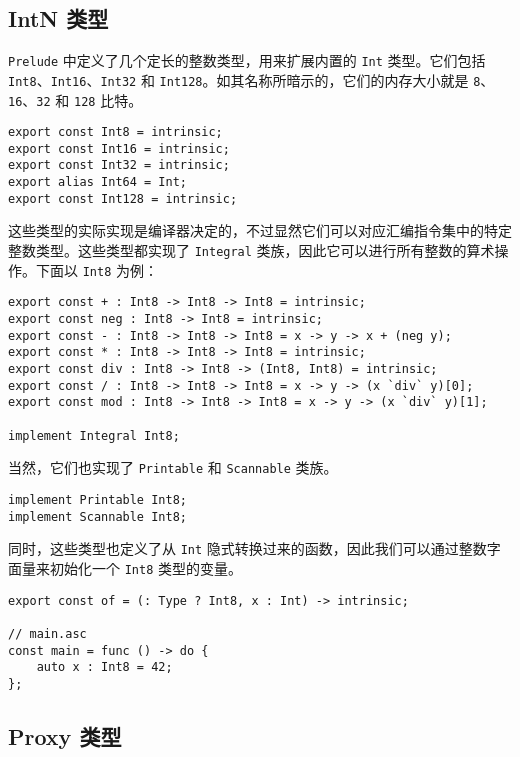 \subsection{IntN 类型}

\lstinline!Prelude! 中定义了几个定长的整数类型，用来扩展内置的 \lstinline!Int! 类型。它们包括 \lstinline!Int8!、\lstinline!Int16!、\lstinline!Int32! 和 \lstinline!Int128!。如其名称所暗示的，它们的内存大小就是 \lstinline!8!、\lstinline!16!、\lstinline!32! 和 \lstinline!128! 比特。

\begin{lstlisting}
export const Int8 = intrinsic;
export const Int16 = intrinsic;
export const Int32 = intrinsic;
export alias Int64 = Int;
export const Int128 = intrinsic;
\end{lstlisting}

这些类型的实际实现是编译器决定的，不过显然它们可以对应汇编指令集中的特定整数类型。这些类型都实现了 \lstinline!Integral! 类族，因此它可以进行所有整数的算术操作。下面以 \lstinline!Int8! 为例：

\begin{lstlisting}
export const + : Int8 -> Int8 -> Int8 = intrinsic;
export const neg : Int8 -> Int8 = intrinsic;
export const - : Int8 -> Int8 -> Int8 = x -> y -> x + (neg y);
export const * : Int8 -> Int8 -> Int8 = intrinsic;
export const div : Int8 -> Int8 -> (Int8, Int8) = intrinsic;
export const / : Int8 -> Int8 -> Int8 = x -> y -> (x `div` y)[0];
export const mod : Int8 -> Int8 -> Int8 = x -> y -> (x `div` y)[1];

implement Integral Int8;
\end{lstlisting}

当然，它们也实现了 \lstinline!Printable! 和 \lstinline!Scannable! 类族。

\begin{lstlisting}
implement Printable Int8;
implement Scannable Int8;
\end{lstlisting}

同时，这些类型也定义了从 \lstinline!Int! 隐式转换过来的函数，因此我们可以通过整数字面量来初始化一个 \lstinline!Int8! 类型的变量。

\begin{lstlisting}
export const of = (: Type ? Int8, x : Int) -> intrinsic;

// main.asc
const main = func () -> do {
    auto x : Int8 = 42;
};
\end{lstlisting}



\subsection{Proxy 类型}

